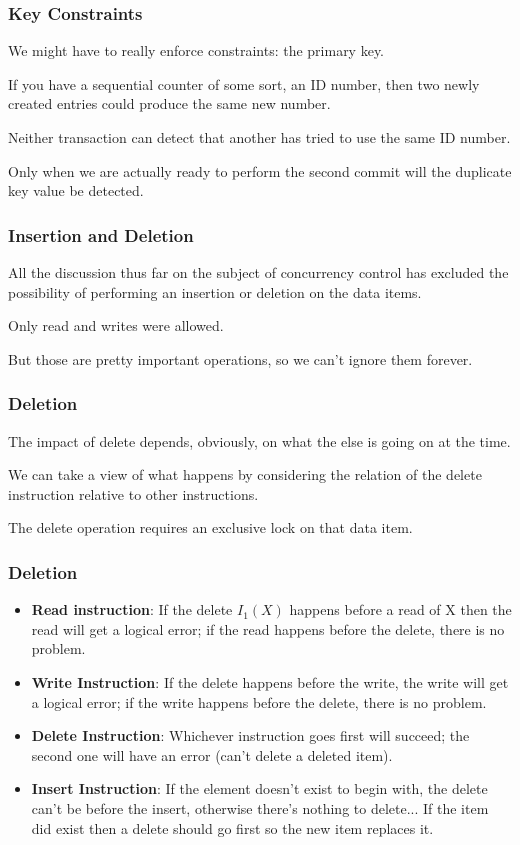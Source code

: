\begin{frame}
\frametitle{Key Constraints}
We might have to really enforce constraints: the primary key. 

If you have a sequential counter of some sort, an ID number, then two newly created entries could produce the same new number. 

Neither transaction can detect that another has tried to use the same ID number. 

Only when we are actually ready to perform the second commit will the duplicate key value be detected.


\end{frame}

\begin{frame}
\frametitle{Insertion and Deletion}

All the discussion thus far on the subject of concurrency control has excluded the possibility of performing an insertion or deletion on the data items. 

Only read and writes were allowed. 

But those are pretty important operations, so we can't ignore them forever. 


\end{frame}

\begin{frame}
\frametitle{Deletion}

The impact of delete depends, obviously, on what the else is going on at the time. 

We can take a view of what happens by considering the relation of the delete instruction relative to other instructions. 

The delete operation requires an exclusive lock on that data item.

\end{frame}


\begin{frame}
\frametitle{Deletion}

\begin{itemize}
	\item \textbf{Read instruction}: If the delete $I_{1}(X)$ happens before a read of X then the read will get a logical error; if the read happens before the delete, there is no problem.
	\item \textbf{Write Instruction}: If the delete happens before the write, the write will get a logical error; if the write happens before the delete, there is no problem.
	\item \textbf{Delete Instruction}: Whichever instruction goes first will succeed; the second one will have an error (can't delete a deleted item).
	\item \textbf{Insert Instruction}: If the element doesn't exist to begin with, the delete can't be before the insert, otherwise there's nothing to delete... If the item did exist then a delete should go first so the new item replaces it.
\end{itemize}


\end{frame}

